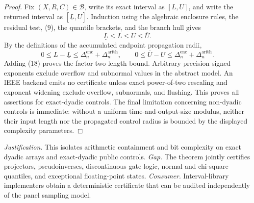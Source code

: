 \documentclass{article}
\begin{document}
\begin{proof}
Fix \((X,R,C)\in\mathcal B\), write its exact interval as \([L,U]\), and write
the returned interval as \([\underline L,\overline U]\).  Induction using the
algebraic enclosure rules, the residual test, (9), the quantile brackets, and the
branch hull gives
\[
\underline L\le L\le U\le\overline U.                               \tag{17}
\]
By the definitions of the accumulated endpoint propagation radii,
\[
0\le L-\underline L\le
\Delta_n^{\mathrm{enc}}+\Delta_n^{\mathrm{arith}},
\qquad
0\le\overline U-U\le
\Delta_n^{\mathrm{enc}}+\Delta_n^{\mathrm{arith}}.                   \tag{18}
\]
Adding (18) proves the factor-two length bound.  Arbitrary-precision signed
exponents exclude overflow and subnormal values in the abstract model.  An IEEE
backend emits no certificate unless exact power-of-two rescaling and exponent
widening exclude overflow, subnormals, and flushing.  This proves all assertions
for exact-dyadic controls.  The final limitation concerning non-dyadic controls
is immediate: without a uniform time-and-output-size modulus, neither their
input length nor the propagated control radius is bounded by the displayed
complexity parameters.
\end{proof}
\par\smallskip\noindent \textit{Justification.} This isolates arithmetic containment and bit complexity on exact dyadic arrays and exact-dyadic public controls. \textit{Gap.} The theorem jointly certifies projectors, pseudoinverses, discontinuous gate logic, normal and chi-square quantiles, and exceptional floating-point states. \textit{Consumer.} Interval-library implementers obtain a deterministic certificate that can be audited independently of the panel sampling model.
\end{document}
